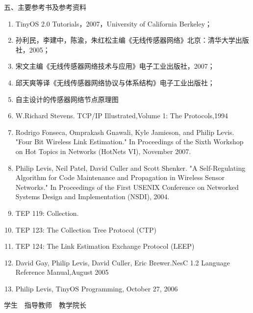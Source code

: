\documentclass[12pt,a4paper]{article}
\newcommand{\hei}{\CJKfamily{hei}}
\newcommand{\sihao}{\fontsize{14pt}{21pt}\selectfont}    %
\begin{document}
\newpage
 
{\noindent\sihao\hei 五、主要参考书及参考资料}
\begin{enumerate}  \setlength{\itemsep}{-5pt}
\vspace{-5pt}
\item TinyOS 2.0 Tutorials，2007，University of California Berkeley；
\item 孙利民，李建中，陈渝，朱红松主编《无线传感器网络》北京：清华大学出版社，2005；
\item 宋文主编《无线传感器网络技术与应用》电子工业出版社，2007；
\item 邱天爽等译《无线传感器网络协议与体系结构》电子工业出版社；
\item 自主设计的传感器网络节点原理图
\item W.Richard Stevens. TCP/IP Illustrated,Volume 1: The Protocols,1994
\item Rodrigo Fonseca, Omprakash Gnawali, Kyle Jamieson, and Philip Levis. "Four Bit Wireless Link Estimation." In Proceedings of the Sixth Workshop on Hot Topics in Networks (HotNets VI), November 2007.
\item Philip Levis, Neil Patel, David Culler and Scott Shenker. "A Self-Regulating Algorithm for Code Maintenance and Propagation in Wireless Sensor Networks." In Proceedings of the First USENIX Conference on Networked Systems Design and Implementation (NSDI), 2004.
\item TEP 119: Collection.
\item TEP 123: The Collection Tree Protocol (CTP)
\item TEP 124: The Link Estimation Exchange Protocol (LEEP)
\item David Gay, Philip Levis, David Culler, Eric Brewer.NesC 1.2 Language Reference Manual,August 2005
\item Philip Levis, TinyOS Programming, October 27, 2006
\end{enumerate}
\vspace{1cm}
\begin{center}
\sihao\hei
\mbox{学生 \underline{\hspace{2.6cm}} \hspace{0.4cm} 指导教师 \underline{\hspace{2.6cm}} \hspace{0.4cm} 教学院长 \underline{\hspace{2.6cm}}}
\end{center}
\end{document}
